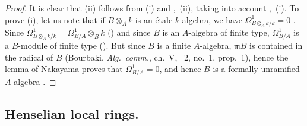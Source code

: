 \begin{proof}
It is clear that (ii) follows from (i) and ,~(ii), taking into account ,~(i).
To prove (i), let us note that if $B\otimes_A k$ is an \'etale $k$-algebra, we have $\Omega^1_{B\otimes_A k/k}=0$ .
Since $\Omega^1_{B\otimes_A k/k}=\Omega^1_{B/A}\otimes_B k$ () and since $B$ is an $A$-algebra of finite type, $\Omega^1_{B/A}$ is a $B$-module of finite type ().
But since $B$ is a finite $A$-algebra, $\mathfrak{m}B$ is contained in the radical of $B$ (Bourbaki, \emph{Alg.\ comm.}, ch.~V, \textsection~2, no.~1, prop.~1), hence the lemma of Nakayama proves that $\Omega^1_{B/A}=0$, and hence $B$ is a formally unramified $A$-algebra .
\end{proof}


\subsection{Henselian local rings.}
\label{subsection:IV.18.5}

